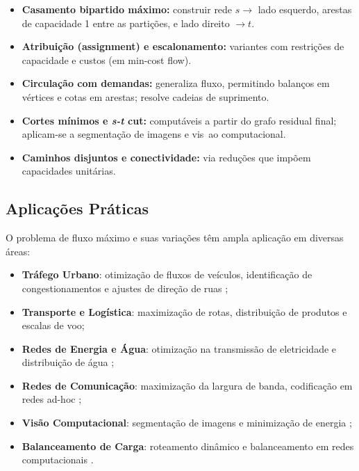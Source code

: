 \documentclass[12pt]{article}
\begin{document}
\begin{itemize} 
\item \textbf{Casamento bipartido máximo:} construir rede $s\to$ lado esquerdo, arestas de capacidade 1 entre as partições, e lado direito $\to t$. 
\item \textbf{Atribuição (assignment) e escalonamento:} variantes com restrições de capacidade e custos (em min-cost flow). 
\item \textbf{Circulação com demandas:} generaliza fluxo, permitindo balanços em vértices e cotas em arestas; resolve cadeias de suprimento. 
\item \textbf{Cortes mínimos e \emph{s-t} cut:} computáveis a partir do grafo residual final; aplicam-se a segmentação de imagens e vis~ao computacional. 
\item \textbf{Caminhos disjuntos e conectividade:} via reduções que impõem capacidades unitárias. \end{itemize}



\subsection{Aplicações Práticas}

O problema de fluxo máximo e suas variações têm ampla aplicação em diversas áreas:


\begin{itemize}
    \item \textbf{Tráfego Urbano}: otimização de fluxos de veículos, identificação de congestionamentos e ajustes de direção de ruas \cite{saidane2002traffic, gupta2016traffic, dolgopolov2019traffic, gong2022traffic, iemini1994dynamic};
    \item \textbf{Transporte e Logística}: maximização de rotas, distribuição de produtos e escalas de voo;
    \item \textbf{Redes de Energia e Água}: otimização na transmissão de eletricidade e distribuição de água \cite{bulut2021optimization};
    \item \textbf{Redes de Comunicação}: maximização da largura de banda, codificação em redes ad-hoc \cite{neto2015communication, zhang2005ad};
    \item \textbf{Visão Computacional}: segmentação de imagens e minimização de energia \cite{boykov2001};
    \item \textbf{Balanceamento de Carga}: roteamento dinâmico e balanceamento em redes computacionais \cite{tsiaka2008load, peijun2011routing}.
\end{itemize}
\end{document}
